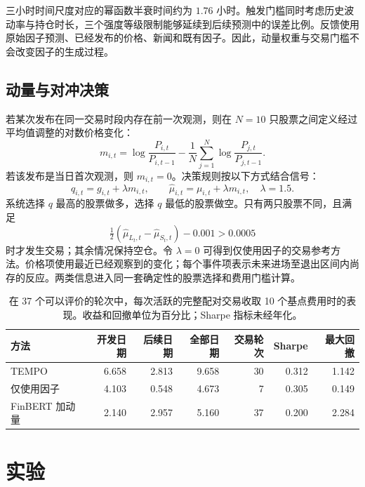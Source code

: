 \documentclass[conference]{IEEEtran}
\begin{document}
三小时时间尺度对应的幂函数半衰时间约为 $1.76$ 小时。触发门槛同时考虑历史波动率与持仓时长，三个强度等级限制能够延续到后续预测中的误差比例。反馈使用原始因子预测、已经发布的价格、新闻和既有因子。因此，动量权重与交易门槛不会改变因子的生成过程。

\subsection{动量与对冲决策}
若某次发布在同一交易时段内存在前一次观测，则在 $N=10$ 只股票之间定义经过平均值调整的对数价格变化：
\begin{equation}
 m_{i,t}=\log\frac{P_{i,t}}{P_{i,t-1}}-
 \frac{1}{N}\sum_{j=1}^{N}\log\frac{P_{j,t}}{P_{j,t-1}}.
\end{equation}
若该发布是当日首次观测，则 $m_{i,t}=0$。决策规则按以下方式结合信号：
\begin{equation}
 q_{i,t}=g_{i,t}+\lambda m_{i,t},\qquad
 \widehat\mu_{i,t}=\mu_{i,t}+\lambda m_{i,t},\quad \lambda=1.5.
\end{equation}
系统选择 $q$ 最高的股票做多，选择 $q$ 最低的股票做空。只有两只股票不同，且满足
\begin{equation}
 \tfrac12(\widehat\mu_{L_t,t}-\widehat\mu_{S_t,t})-0.001>0.0005
\end{equation}
时才发生交易；其余情况保持空仓。令 $\lambda=0$ 可得到仅使用因子的交易参考方法。价格项使用最近已经观察到的变化；每个事件项表示未来进场至退出区间内尚存的反应。两类信息进入同一套确定性的股票选择和费用门槛计算。

\begin{table}[!t]
\centering
\caption{在 37 个可以评价的轮次中，每次活跃的完整配对交易收取 10 个基点费用时的表现。收益和回撤单位为百分比；Sharpe 指标未经年化。}
\label{tab:performance}
\begin{tabular}{lrrrrrr}
\toprule
方法 & 开发日期 & 后续日期 & 全部日期 & 交易轮次 & Sharpe & 最大回撤\\
\midrule
TEMPO & 6.658 & 2.813 & 9.658 & 30 & 0.312 & 1.142\\
仅使用因子 & 4.103 & 0.548 & 4.673 & 7 & 0.305 & 0.149\\
FinBERT 加动量 & 2.140 & 2.957 & 5.160 & 37 & 0.200 & 2.284\\
\bottomrule
\end{tabular}
\end{table}

\section{实验}
\end{document}
